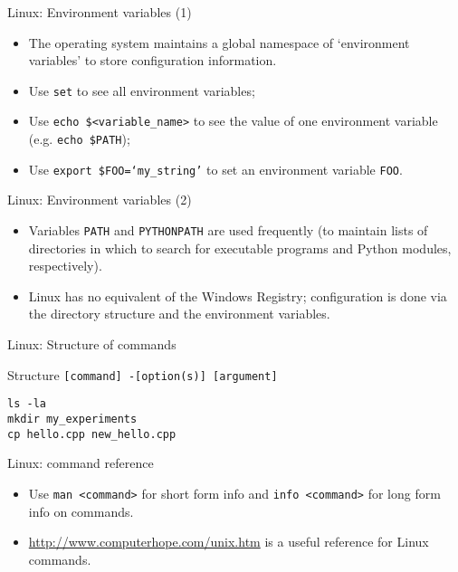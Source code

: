\documentclass{beamer}
\newcommand{\command}[1]{\colorbox{light-gray}{\texttt{#1}}}
\begin{document}
\begin{frame}{Linux: Environment variables (1)}
  \begin{itemize}
    \item The operating system maintains a global namespace of `environment variables' to store configuration information.
    \item Use  \command{set} to see all environment variables;
    \item Use \command{echo \$<variable\_name>} to see the value of one environment variable (e.g. \command{echo \$PATH});
    \item Use \command{export \$FOO=`my\_string'} to set an environment variable \texttt{FOO}.
  \end{itemize}
\end{frame}


\begin{frame}{Linux: Environment variables (2)}
  \begin{itemize}
    \item Variables \texttt{PATH} and \texttt{PYTHONPATH} are used frequently (to maintain lists of directories in which to search for executable programs and Python modules, respectively).
    \item Linux has no equivalent of the Windows Registry; configuration is done via the directory structure and the environment variables.
  \end{itemize}
\end{frame}


\begin{frame}{Linux: Structure of commands}
  \begin{block}{Structure}
    \command{[command] -[option(s)] [argument]}
  \end{block}
  \begin{Examples}
     \command{ls -la} \\
     \command{mkdir my\_experiments} \\
     \command{cp hello.cpp new\_hello.cpp}
  \end{Examples}
\end{frame}


\begin{frame}{Linux: command reference}
  \begin{itemize}
  \item Use \command{man <command>} for short form info and \command{info <command>} for long form info on commands.
  \item \url{http://www.computerhope.com/unix.htm} is a useful reference for Linux commands.
\end{itemize}
\end{frame}
\end{document}
